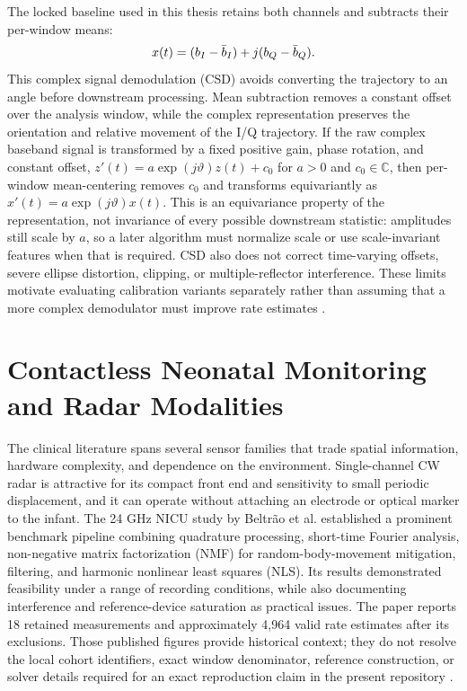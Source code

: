 The locked baseline used in this thesis retains both channels and subtracts their per-window means:
\begin{equation}
  x(t) = (b_I-\bar b_I)+j(b_Q-\bar b_Q).
  \label{eq:ch2_csd}
\end{equation}
This complex signal demodulation (CSD) avoids converting the trajectory to an angle before
downstream processing. Mean subtraction removes a constant offset over the analysis window, while
the complex representation preserves the orientation and relative movement of the I/Q trajectory.
If the raw complex baseband signal is transformed by a fixed positive gain, phase rotation, and
constant offset, $z'(t)=a\exp(j\vartheta)z(t)+c_0$ for $a>0$ and $c_0\in\mathbb{C}$, then per-window
mean-centering removes $c_0$ and transforms equivariantly as $x'(t)=a\exp(j\vartheta)x(t)$. This is
an equivariance property of the representation, not invariance of every possible downstream
statistic: amplitudes still scale by $a$, so a later algorithm must normalize scale or use
scale-invariant features when that is required. CSD also does not correct time-varying offsets,
severe ellipse distortion, clipping, or multiple-reflector interference. These limits motivate
evaluating calibration variants separately rather than assuming that a more complex demodulator must
improve rate estimates \citep{li2008random,li2013review,droitcour2004range}.

\section{Contactless Neonatal Monitoring and Radar Modalities}
\label{sec:ch2_nicu_literature}

The clinical literature spans several sensor families that trade spatial information, hardware
complexity, and dependence on the environment. Single-channel CW radar is attractive for its
compact front end and sensitivity to small periodic displacement, and it can operate without
attaching an electrode or optical marker to the infant. The 24 GHz NICU study by Beltr\~ao et al.
established a prominent benchmark pipeline combining quadrature processing, short-time Fourier
analysis, non-negative matrix factorization (NMF) for random-body-movement mitigation, filtering,
and harmonic nonlinear least squares (NLS). Its results demonstrated feasibility under a range of
recording conditions, while also documenting interference and reference-device saturation as
practical issues. The paper reports 18 retained measurements and approximately 4,964 valid rate
estimates after its exclusions. Those published figures provide historical context; they do not
resolve the local cohort identifiers, exact window denominator, reference construction, or solver
details required for an exact reproduction claim in the present repository
\citep{beltrao2022contactless}.

